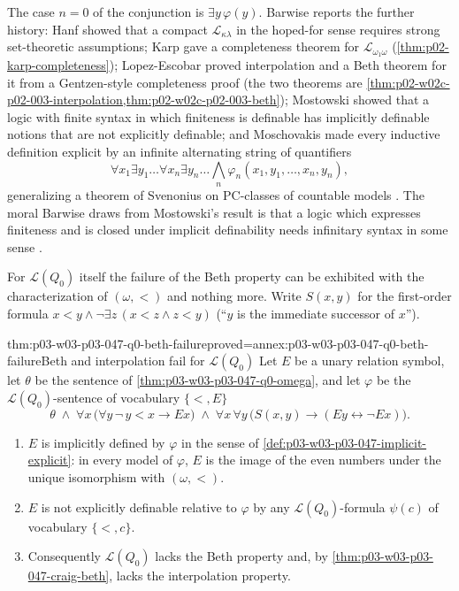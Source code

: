 The case \(n=0\) of the conjunction is \(\exists y\,\varphi(y)\).  Barwise
reports the further history: Hanf showed that a compact
\(\mathscr L_{\kappa\lambda}\) in the hoped-for sense requires strong
set-theoretic assumptions; Karp gave a completeness theorem for
\(\mathscr L_{\omega_1\omega}\) (\cref{thm:p02-karp-completeness});
Lopez-Escobar proved interpolation and a Beth theorem for it from a
Gentzen-style completeness proof (the two theorems are
\cref{thm:p02-w02c-p02-003-interpolation,thm:p02-w02c-p02-003-beth});
Mostowski showed that a logic with finite
syntax in which finiteness is definable has implicitly definable notions that
are not explicitly definable; and Moschovakis made every inductive definition
explicit by an infinite alternating string of quantifiers
\[
 \forall x_1\exists y_1\ldots\forall x_n\exists y_n\ldots
 \bigwedge_n\varphi_n(x_1,y_1,\ldots,x_n,y_n),
\]
generalizing a theorem of Svenonius on PC-classes of countable models
\cite[Ch.~I, \S1.6, pp.~10--11]{Barwise1985BackgroundAims}.  The moral Barwise
draws from Mostowski's result is that a logic which expresses finiteness and
is closed under implicit definability needs infinitary syntax in some sense
\cite[Ch.~I, \S1.6, p.~10]{Barwise1985BackgroundAims}.

For \(\mathscr L(Q_0)\) itself the failure of the Beth property can be
exhibited with the characterization of \((\omega,<)\) and nothing more.
Write \(S(x,y)\) for the first-order formula
\(x<y\land\neg\exists z\,(x<z\land z<y)\) (``\(y\) is the immediate successor
of \(x\)'').

\begin{hbtheorem}{thm:p03-w03-p03-047-q0-beth-failure}{proved=annex:p03-w03-p03-047-q0-beth-failure}{Beth and interpolation fail for \(\mathscr L(Q_0)\)}
Let \(E\) be a unary relation symbol, let \(\theta\) be the sentence of
\cref{thm:p03-w03-p03-047-q0-omega}, and let \(\varphi\) be the
\(\mathscr L(Q_0)\)-sentence of vocabulary \(\{<,E\}\)
\[
 \theta\;\land\;\forall x\,\bigl(\forall y\,\neg\,y<x\to Ex\bigr)
 \;\land\;\forall x\,\forall y\,\bigl(S(x,y)\to(Ey\leftrightarrow\neg Ex)\bigr).
\]
\begin{enumerate}
 \item \(E\) is implicitly defined by \(\varphi\) in the sense of
       \cref{def:p03-w03-p03-047-implicit-explicit}: in every model of
       \(\varphi\), \(E\) is the image of the even numbers under the unique
       isomorphism with \((\omega,<)\).
 \item \(E\) is not explicitly definable relative to \(\varphi\) by any
       \(\mathscr L(Q_0)\)-formula \(\psi(c)\) of vocabulary \(\{<,c\}\).
 \item Consequently \(\mathscr L(Q_0)\) lacks the Beth property and, by
       \cref{thm:p03-w03-p03-047-craig-beth}, lacks the interpolation
       property.
\end{enumerate}
\end{hbtheorem}

